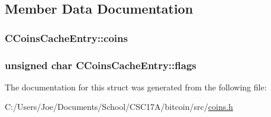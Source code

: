 \subsection{Member Data Documentation}
\hypertarget{struct_c_coins_cache_entry_a343585f1fcb810f9c21fc25ae42a1eba}{}
\subsubsection[{coins}]{ C\+Coins\+Cache\+Entry\+::coins}\label{struct_c_coins_cache_entry_a343585f1fcb810f9c21fc25ae42a1eba}
\hypertarget{struct_c_coins_cache_entry_a05225c349f51777385e3a1c9b0eeaaed}{}
\subsubsection[{flags}]{\setlength{\rightskip}{0pt plus 5cm}unsigned char C\+Coins\+Cache\+Entry\+::flags}\label{struct_c_coins_cache_entry_a05225c349f51777385e3a1c9b0eeaaed}


The documentation for this struct was generated from the following file\+:\begin{DoxyCompactItemize}
\item 
C\+:/\+Users/\+Joe/\+Documents/\+School/\+C\+S\+C17\+A/bitcoin/src/\hyperlink{coins_8h}{coins.\+h}\end{DoxyCompactItemize}
